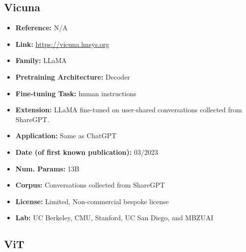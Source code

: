 \documentclass{article}
\begin{document}
\subsection{Vicuna}
            \begin{itemize}
                \item \textbf{Reference:} N/A
                \item \textbf{Link:} \url{https://vicuna.lmsys.org}
                \item \textbf{Family:} LLaMA
                \item \textbf{Pretraining Architecture:} Decoder
                \item \textbf{Fine-tuning Task:} human instructions
                \item \textbf{Extension:} LLaMA fine-tuned on user-shared conversations collected from ShareGPT.
                \item \textbf{Application:} Same as ChatGPT
                \item \textbf{Date (of first known publication):} 03/2023
                \item \textbf{Num. Params:} 13B
                \item \textbf{Corpus:} Conversations collected from ShareGPT
                \item \textbf{License:} Limited, Non-commercial bespoke license
                \item \textbf{Lab:} UC Berkeley, CMU, Stanford, UC San Diego, and MBZUAI
            \end{itemize}
            
\subsection{ViT}
\end{document}
